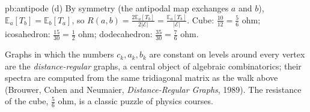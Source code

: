 \begin{solution}{pb:antipode}
(d) By symmetry (the antipodal map exchanges $a$ and $b$), $\mathbb E_a[T_b]=\mathbb E_b[T_a]$, so $R(a,b)=\frac{2\mathbb E_a[T_b]}{2|\mathcal E|}=\frac{\mathbb E_a[T_b]}{|\mathcal E|}$. Cube: $\frac{10}{12}=\frac56$ ohm; icosahedron:
$\frac{15}{30}=\frac12$ ohm; dodecahedron: $\frac{35}{30}=\frac76$ ohm.

\leads Graphs in which the numbers $c_k,a_k,b_k$ are constant on levels around every vertex are the \emph{distance-regular} graphs, a central object of
algebraic combinatorics; their spectra are computed from the same tridiagonal matrix as the walk above (Brouwer, Cohen and Neumaier,
\emph{Distance-Regular Graphs}, 1989). The resistance of the cube, $\frac56$ ohm, is a classic puzzle of physics courses.
\end{solution}

